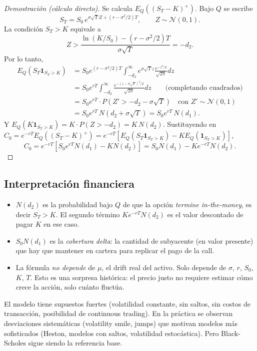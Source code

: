 \documentclass[11pt, a4paper]{article}
\begin{document}
\begin{proof}[Demostración (cálculo directo)]
Se calcula $E_Q((S_T - K)^+)$. Bajo $Q$ se escribe
$$ S_T = S_0 \, e^{\sigma \sqrt{T} Z + (r - \sigma^2/2) T}, \qquad Z \sim \mathcal{N}(0, 1). $$
La condición $S_T > K$ equivale a
$$ Z > \frac{\ln(K/S_0) - (r - \sigma^2/2) T}{\sigma \sqrt{T}} = -d_2. $$
Por lo tanto,
\begin{align*}
E_Q(S_T \mathbf{1}_{S_T > K}) &= S_0 e^{(r - \sigma^2/2) T} \int_{-d_2}^\infty e^{\sigma \sqrt{T} z}
\frac{e^{-z^2/2}}{\sqrt{2\pi}} dz \\
&= S_0 e^{rT} \int_{-d_2}^\infty \frac{e^{-(z - \sigma\sqrt{T})^2/2}}{\sqrt{2\pi}} dz
\qquad \text{(completando cuadrados)} \\
&= S_0 e^{rT} \cdot P(Z' > -d_2 - \sigma\sqrt{T}) \quad \text{con } Z' \sim \mathcal{N}(0,1) \\
&= S_0 e^{rT} \, N(d_2 + \sigma\sqrt{T}) = S_0 e^{rT} \, N(d_1).
\end{align*}
Y $E_Q(K \mathbf{1}_{S_T > K}) = K \cdot P(Z > -d_2) = K \, N(d_2)$. Sustituyendo en
$C_0 = e^{-rT} E_Q((S_T - K)^+) = e^{-rT}[E_Q(S_T \mathbf{1}_{S_T > K}) - K E_Q(\mathbf{1}_{S_T >
K})]$,
$$ C_0 = e^{-rT}[S_0 e^{rT} N(d_1) - K N(d_2)] = S_0 N(d_1) - K e^{-rT} N(d_2). $$
\end{proof}

\subsection{Interpretación financiera}

\begin{itemize}
    \item $N(d_2)$ es la probabilidad bajo $Q$ de que la opción \emph{termine in-the-money}, es
    decir $S_T > K$. El segundo término $K e^{-rT} N(d_2)$ es el valor descontado de pagar $K$
    en ese caso.
    \item $S_0 N(d_1)$ es la \emph{cobertura delta}: la cantidad de subyacente (en valor presente)
    que hay que mantener en cartera para replicar el pago de la call.
    \item La fórmula \emph{no depende} de $\mu$, el drift real del activo. Solo depende de
    $\sigma$, $r$, $S_0$, $K$, $T$. Esto es una sorpresa histórica: el precio justo no requiere
    estimar cómo crece la acción, solo cuánto fluctúa.
\end{itemize}

\obs El modelo tiene supuestos fuertes (volatilidad constante, sin saltos, sin costos de
transacción, posibilidad de continuous trading). En la práctica se observan desviaciones
sistemáticas (volatility smile, jumps) que motivan modelos más sofisticados (Heston, modelos con
saltos, volatilidad estocástica). Pero Black-Scholes sigue siendo la referencia base.
\end{document}
